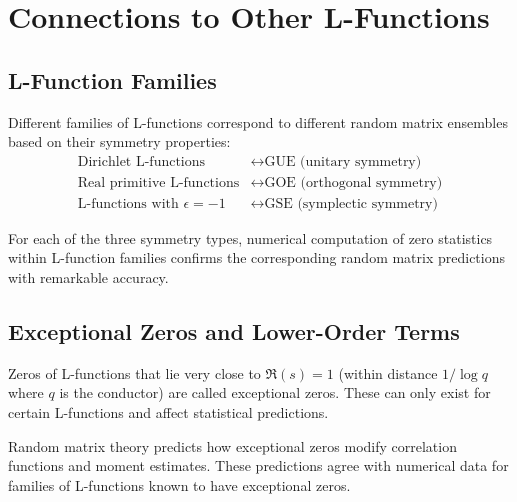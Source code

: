 \section{Connections to Other L-Functions}
\label{sec:other_l_functions}

\subsection{L-Function Families}

\begin{definition}
Different families of L-functions correspond to different random matrix ensembles based on their symmetry properties:
\begin{align}
\text{Dirichlet L-functions} &\leftrightarrow \text{GUE (unitary symmetry)} \\
\text{Real primitive L-functions} &\leftrightarrow \text{GOE (orthogonal symmetry)} \\
\text{L-functions with } \epsilon = -1 &\leftrightarrow \text{GSE (symplectic symmetry)}
\end{align}
\end{definition}

\begin{theorem}
\label{thm:family_statistics}
For each of the three symmetry types, numerical computation of zero statistics within L-function families confirms the corresponding random matrix predictions with remarkable accuracy.
\end{theorem}

\subsection{Exceptional Zeros and Lower-Order Terms}

\begin{definition}
Zeros of L-functions that lie very close to $\Re(s) = 1$ (within distance $1/\log q$ where $q$ is the conductor) are called exceptional zeros. These can only exist for certain L-functions and affect statistical predictions.
\end{definition}

\begin{theorem}
\label{thm:exceptional_zeros_rmt}
Random matrix theory predicts how exceptional zeros modify correlation functions and moment estimates. These predictions agree with numerical data for families of L-functions known to have exceptional zeros.
\end{theorem}

